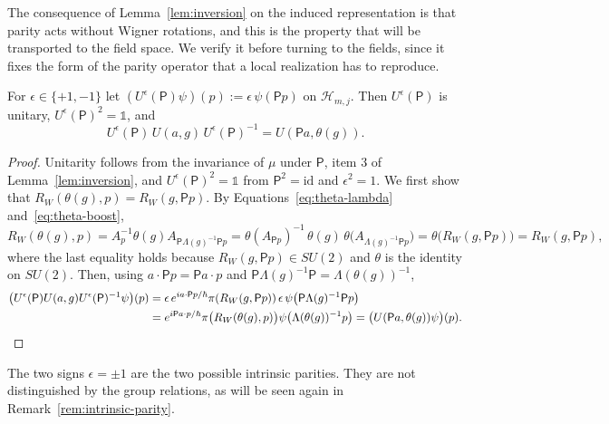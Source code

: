 	The consequence of Lemma~\ref{lem:inversion} on the induced representation is that parity acts without Wigner rotations, and this is the property that will be transported to the field space. We verify it before turning to the fields, since it fixes the form of the parity operator that a local realization has to reproduce.
	
	\begin{lemma}\label{lem:parity-induced}
		For $\epsilon\in\{+1,-1\}$ let $(U^\epsilon(\mathsf{P})\psi)(p):=\epsilon\,\psi(\mathsf{P}p)$ on $\mathcal{H}_{m,j}$. Then $U^\epsilon(\mathsf{P})$ is unitary, $U^\epsilon(\mathsf{P})^2=\mathbb{1}$, and
		\begin{equation}\label{eq:parity-covariance-induced}
			U^\epsilon(\mathsf{P})\,U(a,g)\,U^\epsilon(\mathsf{P})^{-1}=U(\mathsf{P}a,\theta(g)).
		\end{equation}
	\end{lemma}
	
	\begin{proof}
		Unitarity follows from the invariance of $\mu$ under $\mathsf{P}$, item 3 of Lemma~\ref{lem:inversion}, and $U^\epsilon(\mathsf{P})^2=\mathbb{1}$ from $\mathsf{P}^2=\mathrm{id}$ and $\epsilon^2=1$. We first show that $R_W(\theta(g),p)=R_W(g,\mathsf{P}p)$. By Equations~\eqref{eq:theta-lambda} and~\eqref{eq:theta-boost},
		\begin{equation*}
			R_W(\theta(g),p)=A_p^{-1}\theta(g)A_{\mathsf{P}\Lambda(g)^{-1}\mathsf{P}p}=\theta(A_{\mathsf{P}p})^{-1}\,\theta(g)\,\theta\big(A_{\Lambda(g)^{-1}\mathsf{P}p}\big)=\theta\big(R_W(g,\mathsf{P}p)\big)=R_W(g,\mathsf{P}p),
		\end{equation*}
		where the last equality holds because $R_W(g,\mathsf{P}p)\in SU(2)$ and $\theta$ is the identity on $SU(2)$. Then, using $a\cdot\mathsf{P}p=\mathsf{P}a\cdot p$ and $\mathsf{P}\Lambda(g)^{-1}\mathsf{P}=\Lambda(\theta(g))^{-1}$,
		\begin{align*}
			\big(U^\epsilon(\mathsf{P})U(a,g)U^\epsilon(\mathsf{P})^{-1}\psi\big)(p)&=\epsilon\,e^{ia\cdot\mathsf{P}p/\hbar}\pi(R_W(g,\mathsf{P}p))\,\epsilon\,\psi\big(\mathsf{P}\Lambda(g)^{-1}\mathsf{P}p\big)\\
			&=e^{i\mathsf{P}a\cdot p/\hbar}\pi\big(R_W(\theta(g),p)\big)\psi\big(\Lambda(\theta(g))^{-1}p\big)=\big(U(\mathsf{P}a,\theta(g))\psi\big)(p).\qedhere
		\end{align*}
	\end{proof}
	
	\noindent The two signs $\epsilon=\pm1$ are the two possible intrinsic parities. They are not distinguished by the group relations, as will be seen again in Remark~\ref{rem:intrinsic-parity}.
	

